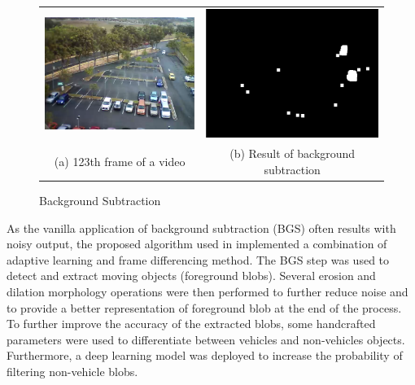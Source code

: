 \begin{figure}[htb!]
  \centering
\begin{tabular}{cc}
 \includegraphics[width=0.4\linewidth]{image/general/bgs1.png} &  \includegraphics[width=0.4\linewidth]{image/general/bgs2.png}  \\
(a) 123th frame of a video & (b) Result of background subtraction \\
\end{tabular}
\caption{Background Subtraction}
\label{fig:bgs}
\end{figure}

As the vanilla application of background subtraction (BGS) often results with noisy output, the proposed algorithm used in \cite{lim2017} implemented a combination of adaptive learning and frame differencing method. The BGS step was used to detect and extract moving objects (foreground blobs). Several erosion and dilation morphology operations were then performed to further reduce noise and to provide a better representation of foreground blob at the end of the process.
To further improve the accuracy of the extracted blobs, some handcrafted parameters were used to differentiate between vehicles and non-vehicles objects. Furthermore, a deep learning model was deployed to increase the probability of filtering non-vehicle blobs.


